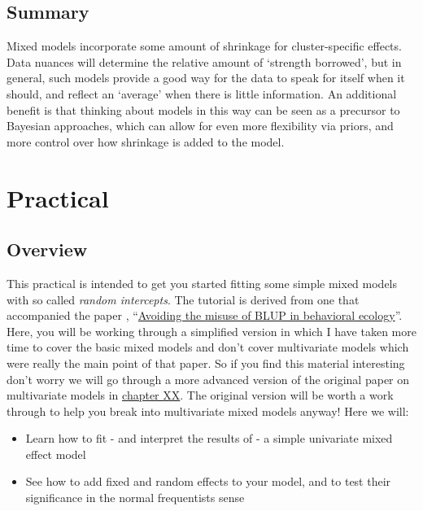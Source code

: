 \documentclass[
  12pt,
]{book}
\providecommand{\tightlist}{%
  \setlength{\itemsep}{0pt}\setlength{\parskip}{0pt}}
\begin{document}
\hypertarget{summary}{%
\subsection{Summary}\label{summary}}

Mixed models incorporate some amount of shrinkage for cluster-specific effects. Data nuances will determine the relative amount of `strength borrowed', but in general, such models provide a good way for the data to speak for itself when it should, and reflect an `average' when there is little information. An additional benefit is that thinking about models in this way can be seen as a precursor to Bayesian approaches, which can allow for even more flexibility via priors, and more control over how shrinkage is added to the model.

\hypertarget{practical-2}{%
\section{Practical}\label{practical-2}}

\hypertarget{overview}{%
\subsection{Overview}\label{overview}}

This practical is intended to get you started fitting some simple mixed models with so called \emph{random intercepts}. The tutorial is derived from one that accompanied the paper \citep{houslay_avoiding_2017}, ``\href{https://doi.org/10.1093/beheco/arx023}{Avoiding the misuse of BLUP in behavioral ecology}''. Here, you will be working through a simplified version in which I have taken more time to cover the basic mixed models and don't cover multivariate models which were really the main point of that paper. So if you find this material interesting don't worry we will go through a more advanced version of the original paper on multivariate models in \protect\hyperlink{to_be_written}{chapter XX}. The original version will be worth a work through to help you break into multivariate mixed models anyway! Here we will:

\begin{itemize}
\tightlist
\item
  Learn how to fit - and interpret the results of - a simple univariate mixed effect model
\item
  See how to add fixed and random effects to your model, and to test their significance in the normal frequentists sense
\end{itemize}
\end{document}

